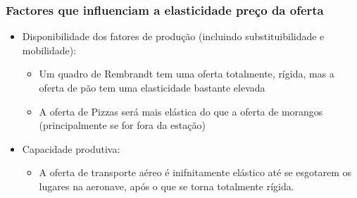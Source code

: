 \begin{frame}
	\frametitle{Factores que influenciam a elasticidade pre\c co da oferta}
	\begin{itemize}
		\item Disponibilidade dos fatores de produ\c c\~ao (incluindo substituibilidade e mobilidade):
		\begin{itemize}
			\item Um quadro de Rembrandt tem uma oferta totalmente, r\'igida, mas a oferta de p\~ao tem uma elasticidade bastante elevada
			\item A oferta de Pizzas ser\'a mais el\'astica do que a oferta de morangos (principalmente se for fora da esta\c c\~ao)
		\end{itemize}
		\item Capacidade produtiva:
		\begin{itemize}
			\item A oferta de transporte a\'ereo \'e inifnitamente el\'astico at\'e se esgotarem os lugares na aeronave, ap\'os o que se torna totalmente r\'igida.
		\end{itemize}
	\end{itemize}
\end{frame}

